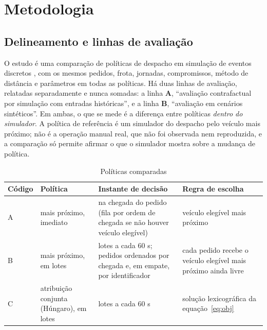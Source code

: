 \section{Metodologia}

\subsection{Delineamento e linhas de avaliação}

O estudo é uma comparação de políticas de despacho em simulação de eventos discretos \cite{banks2010}, com os mesmos pedidos, frota, jornadas, compromissos, método de distância e parâmetros em todas as políticas. Há duas linhas de avaliação, relatadas separadamente e nunca somadas: a linha \textbf{A}, \enquote{avaliação contrafactual por simulação com entradas históricas}, e a linha \textbf{B}, \enquote{avaliação em cenários sintéticos}. Em ambas, o que se mede é a diferença entre políticas \emph{dentro do simulador}. A política de referência é um simulador do despacho pelo veículo mais próximo; não é a operação manual real, que não foi observada nem reproduzida, e a comparação só permite afirmar o que o simulador mostra sobre a mudança de política.

\begin{table}[!htb]
\caption{Políticas comparadas}\label{tab:politicas}
\centering\fontetabela
\begin{tabular}{@{}>{\raggedright\arraybackslash}p{13mm}>{\raggedright\arraybackslash}p{32mm}>{\raggedright\arraybackslash}p{52mm}>{\raggedright\arraybackslash}p{46mm}@{}}
\toprule
Código & Política & Instante de decisão & Regra de escolha \\
\midrule
A & mais próximo, imediato & na chegada do pedido (fila por ordem de chegada se não houver veículo elegível) & veículo elegível mais próximo \\
B & mais próximo, em lotes & lotes a cada 60 s; pedidos ordenados por chegada e, em empate, por identificador & cada pedido recebe o veículo elegível mais próximo ainda livre \\
C & atribuição conjunta (Húngaro), em lotes & lotes a cada 60 s & solução lexicográfica da equação~\ref{eq:obj} \\
\bottomrule
\end{tabular}
\end{table}

